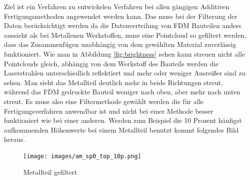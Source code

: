 \documentclass[../main.tex]{subfiles}
\begin{document}
Ziel ist ein Verfahren zu entwickelen Verfahren bei allen gängigen 
Additiven Fertigungsmethoden angewendet werden kann.
Das muss bei der Filterung der Daten berücksichtigt werden
da die Datenverteilung von FDM Bauteilen anders aussieht als bei Metallenen Werkstoffen, 
muss eine Pointcloud so gefiltert werden, dass das Zusammenfügen unabhängig von dem 
gewählten Material zuverlässig funktioniert.
Wie man in Abbildung \ref{fig:brightness} sehen kann streuen nicht alle Pointclouds 
gleich, abhängig von dem Werkstoff des Bauteils werden die Laserstrahlen unterschiedlich
reflektiert und mehr oder weniger Ausreißer sind zu sehen. 
Man sieht das Metallteil deutlich mehr in beide Richtungen 
streut, während das FDM gedruckte Bauteil weniger nach oben, aber mehr nach unten 
streut. Es muss also eine Filtermethode gewählt werden die für alle Fertigungsverfahren
anwendbar ist und nicht bei einer Methode besser funktioniert wie bei einer 
anderen. Werden zum Beispiel die 10 Prozent häufigst aufkommenden Höhenwerte bei einem
Metallteil benutzt kommt folgendes Bild heraus.

\begin{figure}
    \centering
    \texttt{[image: images/am\_sp0\_top\_10p.png]}
    \caption{Metallteil gefiltert}\label{fig:metall_image}
\end{figure}
\end{document}
